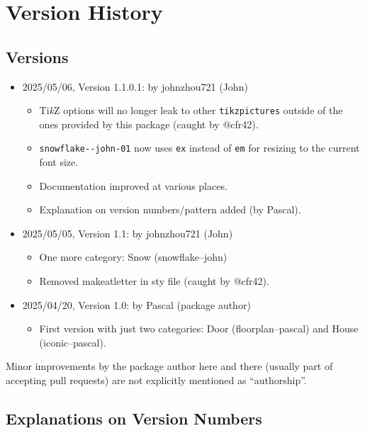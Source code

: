 \documentclass{article}
\begin{document}
\section*{Version History}

\subsection*{Versions}

\begin{itemize}[nosep,parsep=3pt]
  \item 2025/05/06, Version 1.1.0.1: \hfill by johnzhou721 (John)
  \begin{itemize}
      \item Ti\emph{k}Z options will no longer leak to other \verb|tikzpictures| outside of the ones provided by this package (caught by @cfr42).
      \item \verb|snowflake--john-01| now uses \verb|ex| instead of \verb|em| for resizing to the current font size.
      \item Documentation improved at various places.
      \item Explanation on version numbers/pattern added (by Pascal).
  \end{itemize}
  \item 2025/05/05, Version 1.1: \hfill by johnzhou721 (John)
  \begin{itemize}
      \item One more category: Snow (snowflake--john)
      \item Removed makeatletter in sty file (caught by @cfr42).
  \end{itemize}
  \item 2025/04/20, Version 1.0: \hfill by Pascal (package author)
  \begin{itemize}
      \item First version with just two categories: Door (floorplan--pascal) and House (iconic--pascal).
  \end{itemize}
\end{itemize}

Minor improvements by the package author here and there (usually part of accepting pull requests) are not explicitly mentioned as ``authorship''.

\subsection*{Explanations on Version Numbers}
\end{document}
